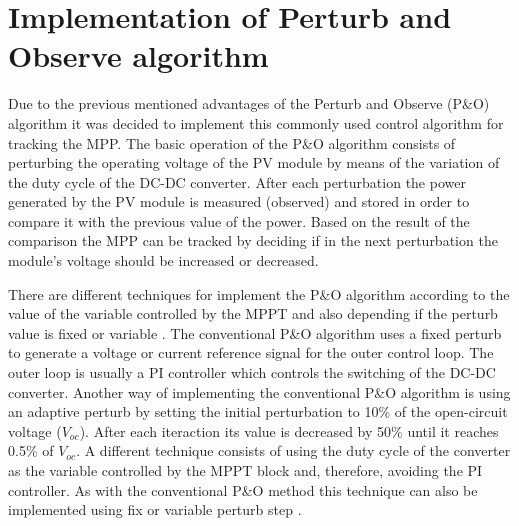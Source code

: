 \section{Implementation of Perturb and Observe algorithm}\label{MPPTImplementation}

Due to the previous mentioned advantages of the Perturb and Observe (P\&O) algorithm it was decided to implement this commonly used control algorithm for tracking the MPP. The basic operation of the P\&O algorithm consists of perturbing the operating voltage of the PV module by means of the variation of the duty cycle of the DC-DC converter. After each perturbation the power generated by the PV module is measured (observed) and stored in order to compare it with the previous value of the power. Based on the result of the comparison the MPP can be tracked by deciding if in the next perturbation the module's voltage should be increased or decreased. 

There are different techniques for implement the P\&O algorithm according to the value of the variable controlled by the MPPT and also depending if the perturb value is fixed or variable . The conventional P\&O algorithm uses a fixed perturb to generate a voltage or current reference signal for the outer control loop. The outer loop is usually a PI controller which controls the switching of the DC-DC converter. Another way of implementing the conventional P\&O algorithm is using an adaptive perturb by setting the initial perturbation to 10\% of the open-circuit voltage ($V_{oc}$). After each iteraction its value is decreased by 50\% until it reaches 0.5\%
of $V_{oc}$. A different technique consists of using the duty cycle of the converter as the variable controlled by the MPPT block and, therefore, avoiding the PI controller. As with the conventional P\&O method this technique can also be implemented using fix or variable perturb step . 


